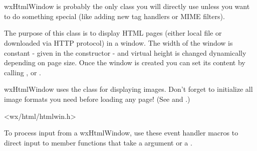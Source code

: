 %
%

\section{}\label{wxhtmlwindow}

wxHtmlWindow is probably the only class you will directly use
unless you want to do something special (like adding new tag
handlers or MIME filters).

The purpose of this class is to display HTML pages (either local
file or downloaded via HTTP protocol) in a window. The width
of the window is constant - given in the constructor - and virtual height
is changed dynamically depending on page size.
Once the window is created you can set its content by calling 
,
 or
.


wxHtmlWindow uses the  class for displaying images.
Don't forget to initialize all image formats you need before loading any page!
(See  and
.)




<wx/html/htmlwin.h>




\twocolwidtha{5cm}
\begin{twocollist}\itemsep=0pt
\end{twocollist}



To process input from a wxHtmlWindow, use these event handler macros to direct input to member
functions that take a  argument or a .

